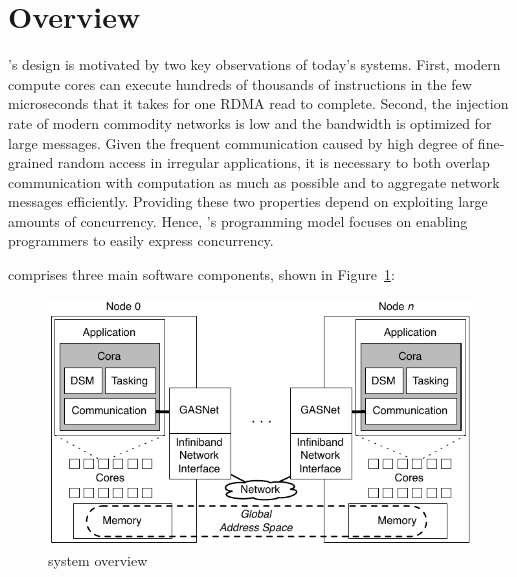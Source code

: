 \section{\Grappa Overview}


\Grappa's design is motivated by two key observations of today's systems.
First, modern compute cores can execute hundreds of thousands of instructions
in the few microseconds that it takes for one RDMA read to complete. Second,
the injection rate of modern commodity networks is low and the bandwidth is
optimized for large messages. Given the frequent communication caused by high
degree of fine-grained random access in irregular applications, it is
necessary to both overlap communication with computation as much as possible
and to aggregate network messages efficiently. Providing these two properties
depend on exploiting large amounts of concurrency. Hence, \Grappa's
programming model focuses on enabling programmers to easily express
concurrency.


\Grappa comprises three main software components, shown in Figure~\ref{fig:grappa}:

\begin{figure}[t]
\begin{center}
  \includegraphics[width=0.95\columnwidth]{figs/system-overview}
\begin{minipage}{0.95\columnwidth}
  \caption{\label{fig:grappa} \Grappa system overview}
\end{minipage}
\vspace{-3ex}
\end{center}
\end{figure}

